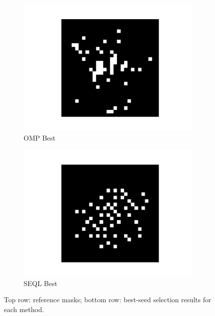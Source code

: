 \documentclass[a4paper,twocolumn]{article} %
\begin{document}
\begin{figure}[h!]
\begin{subfigure}[t]{0.23\linewidth}
        \includegraphics[width=\linewidth]{figures/best_seed_omp.pdf}
        \caption*{OMP Best}
    \end{subfigure}
    \hfill
    \begin{subfigure}[t]{0.23\linewidth}
        \includegraphics[width=\linewidth]{figures/best_seed_seql.pdf}
        \caption*{SEQL Best}
    \end{subfigure}

    \caption{Top row: reference masks; bottom row: best-seed selection results for each method.}
    \label{fig:feature_masks}
\end{figure}
\end{document}
